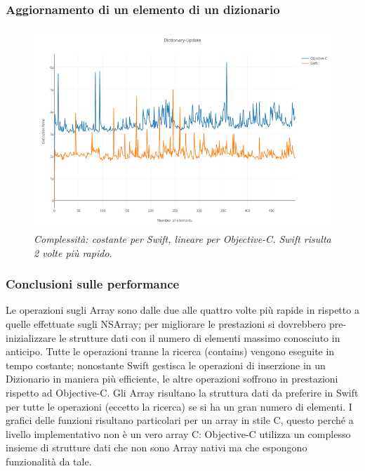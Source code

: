 \subsubsection{Aggiornamento di un elemento di un dizionario}
\begin{figure}[H]
      \centering
      \includegraphics[scale=0.50]{immagini/dictionary_update.png}
            \vspace{0.8cm}
            \caption{\textit{Complessità: costante per Swift, lineare per Objective-C. Swift risulta 2 volte più rapido.}}
\end{figure}
\subsubsection{Conclusioni sulle performance}
Le operazioni sugli Array sono dalle due alle quattro volte più rapide in rispetto a quelle effettuate sugli NSArray; per migliorare le prestazioni si dovrebbero pre-inizializzare le strutture dati con il numero di elementi massimo conosciuto in anticipo. Tutte le operazioni tranne la ricerca (contains) vengono eseguite in tempo costante; nonostante Swift gestisca le operazioni di inserzione in un Dizionario in maniera più efficiente, le altre operazioni soffrono in prestazioni rispetto ad Objective-C. Gli Array risultano la struttura dati da preferire in Swift per tutte le operazioni (eccetto la ricerca) se si ha un gran numero di elementi. I grafici delle funzioni risultano particolari per un array in stile C, questo perché a livello implementativo non è un vero array C: Objective-C utilizza un complesso insieme di strutture dati che non sono Array nativi ma che espongono funzionalità da tale.
    
    
    
    


